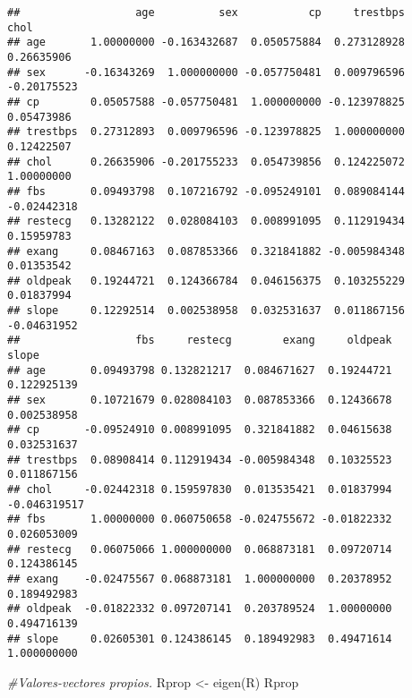 \documentclass[
]{article}
\newenvironment{Shaded}{\begin{snugshade}}{\end{snugshade}}
\newcommand{\CommentTok}[1]{\textcolor[rgb]{0.56,0.35,0.01}{\textit{#1}}}
\newcommand{\FunctionTok}[1]{\textcolor[rgb]{0.00,0.00,0.00}{#1}}
\newcommand{\NormalTok}[1]{#1}
\newcommand{\OtherTok}[1]{\textcolor[rgb]{0.56,0.35,0.01}{#1}}
\begin{document}
\begin{verbatim}
##                  age          sex           cp     trestbps        chol
## age       1.00000000 -0.163432687  0.050575884  0.273128928  0.26635906
## sex      -0.16343269  1.000000000 -0.057750481  0.009796596 -0.20175523
## cp        0.05057588 -0.057750481  1.000000000 -0.123978825  0.05473986
## trestbps  0.27312893  0.009796596 -0.123978825  1.000000000  0.12422507
## chol      0.26635906 -0.201755233  0.054739856  0.124225072  1.00000000
## fbs       0.09493798  0.107216792 -0.095249101  0.089084144 -0.02442318
## restecg   0.13282122  0.028084103  0.008991095  0.112919434  0.15959783
## exang     0.08467163  0.087853366  0.321841882 -0.005984348  0.01353542
## oldpeak   0.19244721  0.124366784  0.046156375  0.103255229  0.01837994
## slope     0.12292514  0.002538958  0.032531637  0.011867156 -0.04631952
##                  fbs     restecg        exang     oldpeak        slope
## age       0.09493798 0.132821217  0.084671627  0.19244721  0.122925139
## sex       0.10721679 0.028084103  0.087853366  0.12436678  0.002538958
## cp       -0.09524910 0.008991095  0.321841882  0.04615638  0.032531637
## trestbps  0.08908414 0.112919434 -0.005984348  0.10325523  0.011867156
## chol     -0.02442318 0.159597830  0.013535421  0.01837994 -0.046319517
## fbs       1.00000000 0.060750658 -0.024755672 -0.01822332  0.026053009
## restecg   0.06075066 1.000000000  0.068873181  0.09720714  0.124386145
## exang    -0.02475567 0.068873181  1.000000000  0.20378952  0.189492983
## oldpeak  -0.01822332 0.097207141  0.203789524  1.00000000  0.494716139
## slope     0.02605301 0.124386145  0.189492983  0.49471614  1.000000000
\end{verbatim}

\begin{Shaded}
\begin{Highlighting}[]
\CommentTok{\#Valores{-}vectores propios.}
\NormalTok{Rprop }\OtherTok{\textless{}{-}} \FunctionTok{eigen}\NormalTok{(R)}
\NormalTok{Rprop}
\end{Highlighting}
\end{Shaded}
\end{document}
